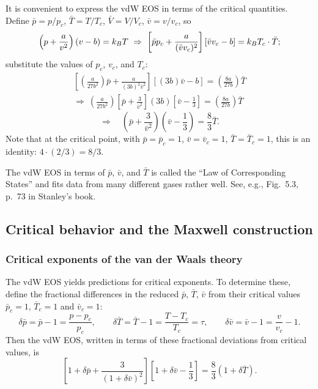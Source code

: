It is convenient to express the vdW EOS in terms of the critical quantities. Define
$\bar p = p/p_c$, $\bar T = T/T_c$, $\bar V = V/V_c$, $\bar v = v/v_c$, so
\begin{equation}
  \left(p + \frac{a}{v^2}\right)(v-b) = k_{B} T\ \Rightarrow\
  \left[\bar pp_c + \frac{a}{(\bar vv_c)^2}\right]\left[\bar vv_c - b\right] = k_{B} T_c\cdot\bar T;
\end{equation}
substitute the values of $p_c$, $v_c$, and $T_c$:
\begin{gather}
  \left[\left(\frac{a}{27b^2}\right)\bar p + \frac{a}{(3b)^2\bar v^2}\right]\left[(3b)\bar v - b\right] = \left(\frac{8a}{27b}\right)\bar T\nonumber\\
  \Rightarrow\ \left(\frac{a}{27b^2}\right)\left[\bar p + \frac{3}{\bar v^2}\right](3b)\left[\bar v - \frac{1}{3}\right] = \left(\frac{8a}{27b}\right)\bar T
\end{gather}
\begin{equation}
  \Rightarrow\quad\boxed{\left(\bar p + \frac{3}{\bar v^2}\right)\left(\bar v - \frac{1}{3}\right) = \frac{8}{3}\bar T}.
\end{equation}
Note that at the critical point, with $\bar p = \bar p_c = 1$, $\bar v = \bar v_c = 1$, $\bar T = \bar T_c = 1$,
this is an identity: $4\cdot(2/3) = 8/3$.

The vdW EOS in terms of $\bar p$, $\bar v$, and $\bar T$ is called the ``Law of Corresponding States'' and fits
data from many different gases rather well. See, e.g., Fig.~5.3, p.~73 in Stanley's book.

\subsection{Critical behavior and the Maxwell construction}
\subsubsection*{Critical exponents of the van der Waals theory}

The vdW EOS yields predictions for critical exponents. To determine these, define the fractional differences in
the reduced $\bar p$, $\bar T$, $\bar v$ from their critical values $\bar p_c = 1$, $\bar T_c = 1$ and
$\bar v_c = 1$:
\begin{equation}
  \delta\bar p = \bar p-1 = \frac{p-p_c}{p_c},\qquad
  \delta\bar T = \bar T-1 = \frac{T-T_c}{T_c} = \tau,\qquad
  \delta\bar v = \bar v-1 = \frac{v}{v_c}-1 .
\end{equation}
Then the vdW EOS, written in terms of these fractional deviations from critical values, is
\begin{equation}\label{eq:vdwdev}
  \left[1+\delta\bar p+\frac{3}{(1+\delta\bar v)^2}\right]\left[1+\delta\bar v-\frac{1}{3}\right] = \frac{8}{3}(1+\delta\bar T).
\end{equation}

